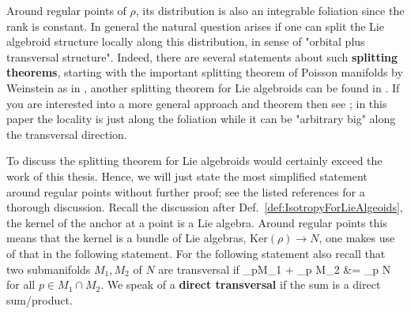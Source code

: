 Around regular points of $\rho$, its distribution is also an integrable foliation since the rank is constant. In general the natural question arises if one can split the Lie algebroid structure locally along this distribution, in sense of "orbital plus transversal structure". Indeed, there are several statements about such \textbf{splitting theorems}, starting with the important splitting theorem of Poisson manifolds by Weinstein as in \cite[Theorem 4.2; page 19]{DaSilva}, another splitting theorem for Lie algebroids can be found in \cite[Theorem 1.1]{fernandes}. If you are interested into a more general approach and theorem then see \cite{meinrenkensplitting}; in this paper the locality is just along the foliation while it can be "arbitrary big" along the transversal direction.

To discuss the splitting theorem for Lie algebroids would certainly exceed the work of this thesis. Hence, we will just state the most simplified statement around regular points without further proof; see the listed references for a thorough discussion. Recall the discussion after Def.~\ref{def:IsotropyForLieAlgeoids}, the kernel of the anchor at a point is a Lie algebra. Around regular points this means that the kernel is a bundle of Lie algebras, $\mathrm{Ker}(\rho) \to N$, one makes use of that in the following statement. For the following statement also recall that two submanifolds $M_1, M_2$ of $N$ are transversal if
\bas
{}_pM_1 + _p M_2
&=
_p N
\eas
for all $p \in M_1 \cap M_2$. We speak of a \textbf{direct transversal} if the sum is a direct sum/product.
%

